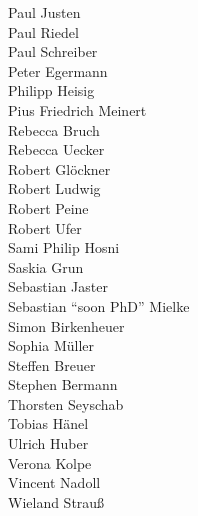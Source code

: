 \begin{minipage}[t][\textheight][b]{.01\textwidth}
{\begin{minipage}[b][\textheight][b]{13em}
Paul Justen\\
Paul Riedel\\
Paul Schreiber\\
Peter Egermann\\
Philipp Heisig\\
Pius Friedrich Meinert\\
Rebecca Bruch\\
Rebecca Uecker\\
Robert Glöckner\\
Robert Ludwig\\
Robert Peine\\
Robert Ufer\\
Sami Philip Hosni\\
Saskia Grun\\
Sebastian Jaster\\
Sebastian ``soon PhD'' Mielke\\
Simon Birkenheuer\\
Sophia Müller\\
Steffen Breuer\\
Stephen Bermann\\
Thorsten Seyschab\\
Tobias Hänel\\
Ulrich Huber\\
Verona Kolpe\\
Vincent Nadoll\\
Wieland Strauß
\end{minipage}
}
\end{minipage}

\enlargethispage{2\baselineskip}

